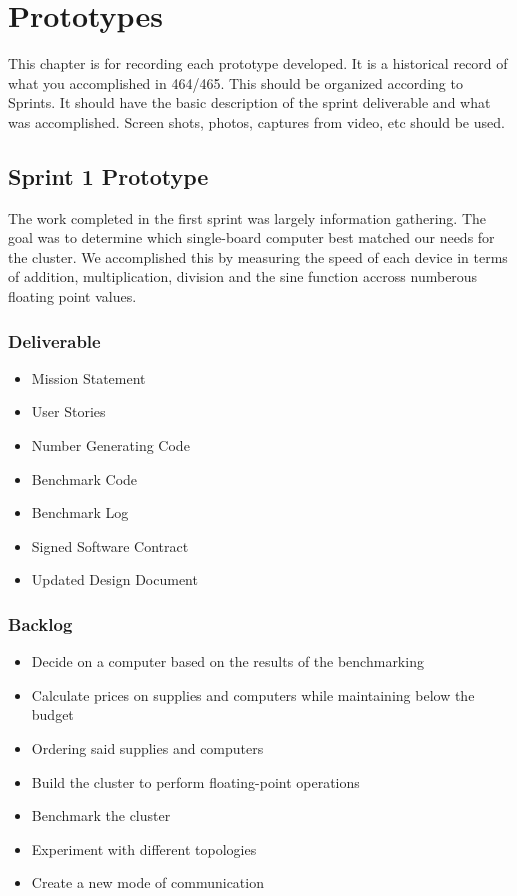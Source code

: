 

\chapter{Prototypes}

This chapter is for recording each prototype developed.  It is a historical record of what you accomplished in 464/465.   This should be organized according to Sprints.  It should have the basic description of the sprint deliverable and what was accomplished.  Screen shots, photos, captures from video, etc should be used.  

\section{Sprint 1 Prototype}

The work completed in the first sprint was largely information gathering. The goal was to determine which single-board computer best matched our needs for the cluster. We accomplished this by measuring the speed of each device in terms of addition, multiplication, division and the sine function accross numberous floating point values. 

\subsection{Deliverable}

\begin{itemize}
\item Mission Statement
\item User Stories
\item Number Generating Code
\item Benchmark Code
\item Benchmark Log
\item Signed Software Contract
\item Updated Design Document
\end{itemize}

\subsection{Backlog}

\begin{itemize}
\item Decide on a computer based on the results of the benchmarking
\item Calculate prices on supplies and computers while maintaining below the budget
\item Ordering said supplies and computers
\item Build the cluster to perform floating-point operations
\item Benchmark the cluster
\item Experiment with different topologies
\item Create a new mode of communication
\end{itemize}

